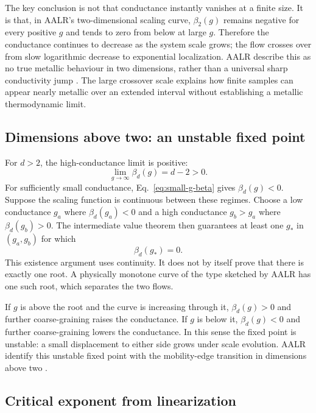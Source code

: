 \documentclass[11pt,a4paper]{article}
\numberwithin{equation}{section}
\begin{document}
The key conclusion is not that conductance instantly vanishes at a finite size. It is that, in AALR's two-dimensional scaling curve, $\beta_2(g)$ remains negative for every positive $g$ and tends to zero from below at large $g$. Therefore the conductance continues to decrease as the system scale grows; the flow crosses over from slow logarithmic decrease to exponential localization. AALR describe this as no true metallic behaviour in two dimensions, rather than a universal sharp conductivity jump \cite{AALR1979}. The large crossover scale explains how finite samples can appear nearly metallic over an extended interval without establishing a metallic thermodynamic limit.

\subsection{Dimensions above two: an unstable fixed point}

For $d>2$, the high-conductance limit is positive:
\begin{equation}
    \lim_{g\to\infty}\beta_d(g)=d-2>0.
\end{equation}
For sufficiently small conductance, Eq.~\eqref{eq:small-g-beta} gives $\beta_d(g)<0$. Suppose the scaling function is continuous between these regimes. Choose a low conductance $g_a$ where $\beta_d(g_a)<0$ and a high conductance $g_b>g_a$ where $\beta_d(g_b)>0$. The intermediate value theorem then guarantees at least one $g_*$ in $(g_a,g_b)$ for which
\begin{equation}
    \beta_d(g_*)=0.
\end{equation}
This existence argument uses continuity. It does not by itself prove that there is exactly one root. A physically monotone curve of the type sketched by AALR has one such root, which separates the two flows.

If $g$ is above the root and the curve is increasing through it, $\beta_d(g)>0$ and further coarse-graining raises the conductance. If $g$ is below it, $\beta_d(g)<0$ and further coarse-graining lowers the conductance. In this sense the fixed point is unstable: a small displacement to either side grows under scale evolution. AALR identify this unstable fixed point with the mobility-edge transition in dimensions above two \cite{AALR1979}.

\subsection{Critical exponent from linearization}
\end{document}
